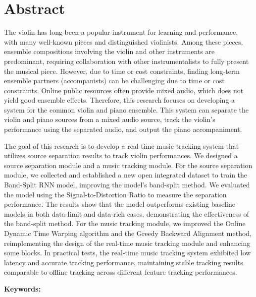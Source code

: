 \documentclass[class=NCU_thesis, crop=false]{standalone}
\begin{document}
\chapter{Abstract}

The violin has long been a popular instrument for learning and performance, 
with many well-known pieces and distinguished violinists. 
Among these pieces, ensemble compositions involving the violin and other instruments are predominant, 
requiring collaboration with other instrumentalists to fully present the musical piece.
However, due to time or cost constraints, 
finding long-term ensemble partners (accompanists) can be challenging due to time or cost constraints.
Online public resources often provide mixed audio, which does not yield good ensemble effects.
Therefore, this research focuses on developing a system for the common violin and piano ensemble. 
This system can separate the violin and piano sources from a mixed audio source,
track the violin's performance using the separated audio, 
and output the piano accompaniment.

The goal of this research is to develop a real-time music tracking system 
that utilizes source separation results to track violin performances.
We designed a source separation module and a music tracking module. 
For the source separation module, 
we collected and established a new open integrated dataset to train the Band-Split RNN model, 
improving the model's band-split method. 
We evaluated the model using the Signal-to-Distortion Ratio 
to measure the separation performance.
The results show that the model outperforms existing baseline models 
in both data-limit and data-rich cases, 
demonstrating the effectiveness of the band-split method.
For the music tracking module, 
we improved the Online Dynamic Time Warping algorithm and 
the Greedy Backward Alignment method, 
reimplementing the design of the real-time music tracking module and 
enhancing some blocks. 
In practical tests, the real-time music tracking system exhibited 
low latency and accurate tracking performance, 
maintaining stable tracking results comparable to offline tracking 
across different feature tracking performances.

\vspace{2em}
\noindent \textbf{Keywords:} \keywordsEn{} %
\end{document}
